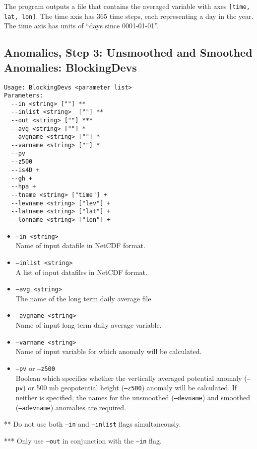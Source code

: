 \documentclass{article}
\begin{document}
The program outputs a file that contains the averaged variable with axes \texttt{[time, lat, lon]}. The time axis has 365 time steps, each representing a day in the year. The time axis has units of ``days since 0001-01-01''.

\subsection{Anomalies, Step 3: Unsmoothed and Smoothed Anomalies: BlockingDevs}\label{dev}
\begin{verbatim}
Usage: BlockingDevs <parameter list>
Parameters:
  --in <string> [""] **
  --inlist <string>  [""] **
  --out <string> [""] ***
  --avg <string> [""] *
  --avgname <string> [""] *
  --varname <string> [""] *
  --pv
  --z500
  --is4D +
  --gh +
  --hpa +
  --tname <string> ["time"] +
  --levname <string> ["lev"] +
  --latname <string> ["lat"] +
  --lonname <string> ["lon"] +
\end{verbatim}

\begin{itemize}
\item[]\texttt{--in <string>}\\ Name of input datafile in NetCDF format.
\item[]\texttt{--inlist <string>} \\ A list of input datafiles in NetCDF format. 
\item[] \texttt{--avg <string>}\\ The name of the long term daily average file 
\item[]\texttt{--avgname <string>}\\Name of input long term daily average variable.
\item[] \texttt{--varname <string>}\\Name of input variable for which anomaly will be calculated.
\item[]\texttt{--pv} or \texttt{--z500}\\Boolean which specifies whether the vertically averaged potential anomaly (\texttt{--pv}) or 500 mb geopotential height (\texttt{--z500}) anomaly will be calculated. If neither is specified, the names for the unsmoothed (\texttt{--devname}) and smoothed (\texttt{--adevname}) anomalies are required.
\end{itemize}

** Do not use both \texttt{--in} and \texttt{--inlist} flags simultaneously.

*** Only use \texttt{--out} in conjunction with the \texttt{--in} flag.
\end{document}
